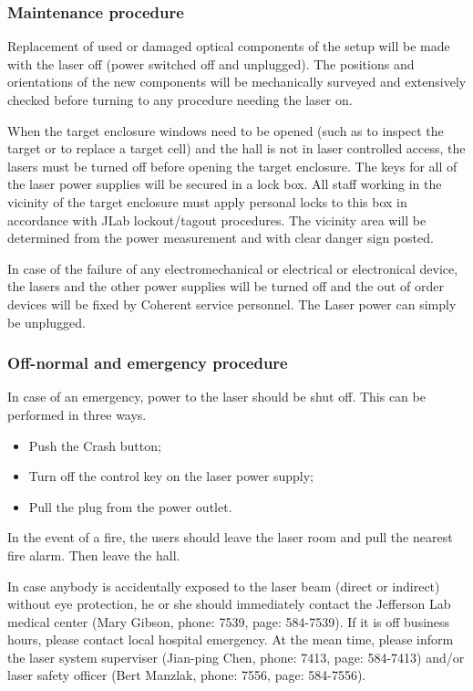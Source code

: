 {\subsubsection{Maintenance procedure}

Replacement of used or damaged optical components of the setup will be made with the
laser off (power switched off and unplugged).  The positions and 
orientations of the new components will be mechanically
surveyed and extensively checked before turning to any procedure needing the laser on.

When the target enclosure windows need to be opened (such as to inspect
the target or to replace a 
target cell) and the hall is not in laser controlled access, 
the lasers must be turned off before opening the target enclosure.
The keys for all of the laser power
supplies will be secured in a lock box.  All staff working in the
vicinity of the target enclosure 
must apply personal locks to this box in accordance with
JLab lockout/tagout procedures.
The vicinity area will be determined
from the power measurement and with clear danger sign posted.

In case of the failure of any electromechanical or electrical or electronical device,
the lasers and the other power supplies will be turned off and the out of order devices
will be fixed by Coherent service personnel. The Laser power
can simply be unplugged.


\subsubsection{Off-normal and emergency procedure}

In case of an emergency, power to the laser should be shut off.
This can be performed in three ways.
\begin {itemize}
\item Push the Crash button;
\item Turn off the control key on the laser power supply;
\item Pull the plug from the power outlet.
\end {itemize}

In the event of a fire, the users should leave the laser room and pull the 
nearest fire alarm. Then leave the hall.

In case anybody is accidentally exposed to the laser beam (direct or indirect)
without eye protection, he or she should immediately contact the Jefferson
Lab medical center (Mary Gibson, phone: 7539, page: 584-7539). If it is 
off business hours, please contact local hospital emergency. At the mean time,
please inform the laser system superviser (Jian-ping Chen, phone: 7413,
page: 584-7413) and/or laser safety officer (Bert Manzlak, phone: 7556,
page: 584-7556). 


}
